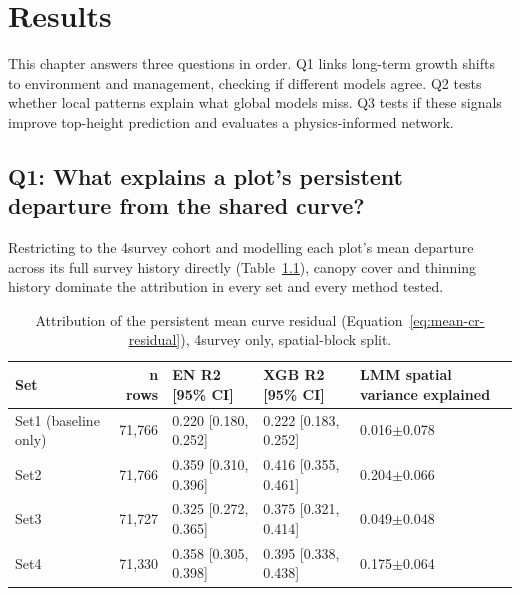 \documentclass[logo,msc,ai]{infthesis}           %
\begin{document}
\chapter{Results} \label{ch:results}
This chapter answers three questions in order. Q1 links long-term growth shifts to environment and management, checking if different models agree. Q2 tests whether local patterns explain what global models miss. Q3 tests if these signals improve top-height prediction and evaluates a physics-informed network.

\section{Q1: What explains a plot's persistent departure from the shared curve?}

Restricting to the 4survey cohort and modelling each plot's mean departure across its
full survey history directly (Table~\ref{tab:results-rq2b}), canopy cover and thinning
history dominate the attribution in every set and every method tested.

\begin{table}[!htbp]
\centering
\scriptsize
\renewcommand{\arraystretch}{1.2}
\begin{tabular}{lrlll}
\toprule
Set & n rows & EN R2 [95\% CI] & XGB R2 [95\% CI] & LMM spatial variance explained \\
\midrule
Set1 (baseline only) & 71{,}766 & 0.220 [0.180, 0.252] & 0.222 [0.183, 0.252] & 0.016$\pm$0.078 \\
Set2 & 71{,}766 & 0.359 [0.310, 0.396] & 0.416 [0.355, 0.461] & 0.204$\pm$0.066 \\
Set3 & 71{,}727 & 0.325 [0.272, 0.365] & 0.375 [0.321, 0.414] & 0.049$\pm$0.048 \\
Set4 & 71{,}330 & 0.358 [0.305, 0.398] & 0.395 [0.338, 0.438] & 0.175$\pm$0.064 \\
\bottomrule
\end{tabular}
\caption{\small{Attribution of the persistent mean curve residual (Equation~\ref{eq:mean-cr-residual}),
4survey only, spatial-block split.}}
\label{tab:results-rq2b} %
\end{table}
\end{document}
